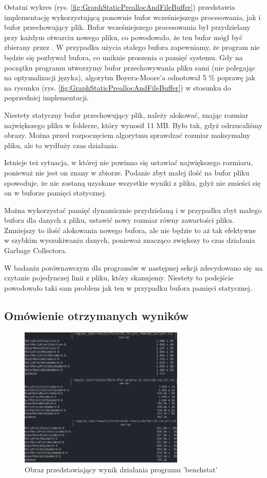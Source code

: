 Ostatni wykres (rys. \ref{fig:GraphStaticPreallocAndFileBuffer}) przedstawia implementację
wykorzystującą ponownie bufor wcześniejszego procesowania, jak i bufor przechowujący plik.
Bufor wcześniejszego procesowania był przydzielany przy każdym otwarciu nowego pliku,
co powodowało, że ten bufor mógł być zbierany przez .
W przypadku użycia stałego bufora zapewniamy, że program nie będzie się pozbywał
bufora, co uniknie proszenia o pamięć systemu. Gdy na początku programu utworzymy
bufor przechowywania pliku sami (nie polegając na optymalizacji języka), algorytm Boyera-Moore'a
odnotował 5 \% poprawę jak na rysunku (rys. \ref{fig:GraphStaticPreallocAndFileBuffer}) w stosunku do poprzedniej implementacji.

Niestety statyczny bufor przechowujący plik, należy alokować, znając rozmiar 
największego pliku w folderze, który wynosił 11 MB. Było tak, gdyż odrzucaliśmy
obrazy. Można przed rozpoczęciem algorytmu sprawdzać rozmiar maksymalny 
pliku, ale to wydłuży czas działania.

Istnieje też sytuacja, w której nie powinno się ustawiać największego rozmiaru, ponieważ nie
jest on znany w zbiorze. Podanie zbyt małej ilość na bufor pliku spowoduje,
że nie zostaną uzyskane wszystkie wyniki z pliku, gdyż nie zmieści się on w buforze pamięci statycznej.

Można wykorzystać pamięć dynamicznie przydzielaną i w przypadku zbyt małego 
bufora dla danych z pliku, ustawić nowy rozmiar równy zawartości pliku.
Zmniejszy to ilość alokowania nowego bufora, ale nie będzie to aż tak efektywne
w szybkim wyszukiwaniu danych, ponieważ znacząco zwiększy to czas działania
Garbage Collectora.

W badaniu porównawczym dla programów w następnej sekcji zdecydowano się na
czytanie pojedynczej linii z pliku, który skanujemy. Niestety to podejście
powodowało taki sam problem jak ten w przypadku bufora pamięci statycznej.

\subsection{Omówienie otrzymanych wyników}

\begin{figure}[htb]
    \centering
    \includegraphics[width=0.7\textwidth]{./images/benchstat-results-sumup.png}
    \caption{Obraz przedstawiający wynik działania programu 'benchstat'}
    \label{fig:benchstatResults}
\end{figure}

